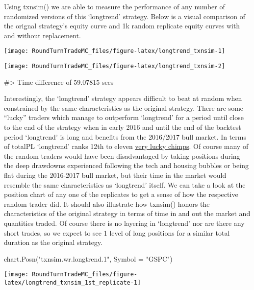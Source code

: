 Using txnsim() we are able to measure the performance of any number of
randomized versions of this `longtrend' strategy. Below is a visual
comparison of the orignal strategy's equity curve and 1k random
replicate equity curves with and without replacement.

\begin{Schunk}


\begin{center}\texttt{[image: RoundTurnTradeMC\_files/figure-latex/longtrend\_txnsim-1]} \end{center}



\begin{center}\texttt{[image: RoundTurnTradeMC\_files/figure-latex/longtrend\_txnsim-2]} \end{center}

\begin{Soutput}
#> Time difference of 59.07815 secs
\end{Soutput}
\end{Schunk}

Interestingly, the `longtrend' strategy appears difficult to beat at
random when constrained by the same characteristics as the original
strategy. There are some ``lucky'' traders which manage to outperform
`longtrend' for a period until close to the end of the strategy when in
early 2016 and until the end of the backtest period `longtrend' is long
and benefits from the 2016/2017 bull market. In terms of totalPL
`longtrend' ranks 12th to eleven
\href{http://www.followingthetrend.com/2016/04/you-cant-beat-all-the-chimps/}{very
lucky chimps}. Of course many of the random traders would have been
disadvantaged by taking positions during the deep drawdowns experienced
following the tech and housing bubbles or being flat during the
2016-2017 bull market, but their time in the market would resemble the
same characteristics as `longtrend' itself. We can take a look at the
position chart of any one of the replicates to get a sense of how the
respective random trader did. It should also illustrate how txnsim()
honors the characteristics of the original strategy in terms of time in
and out the market and quantities traded. Of course there is no layering
in `longtrend' nor are there any short trades, so we expect to see 1
level of long positions for a similar total duration as the original
strategy.

\begin{Schunk}
\begin{Sinput}
chart.Posn("txnsim.wr.longtrend.1", Symbol = "GSPC")
\end{Sinput}


\begin{center}\texttt{[image: RoundTurnTradeMC\_files/figure-latex/longtrend\_txnsim\_1st\_replicate-1]} \end{center}

\end{Schunk}

